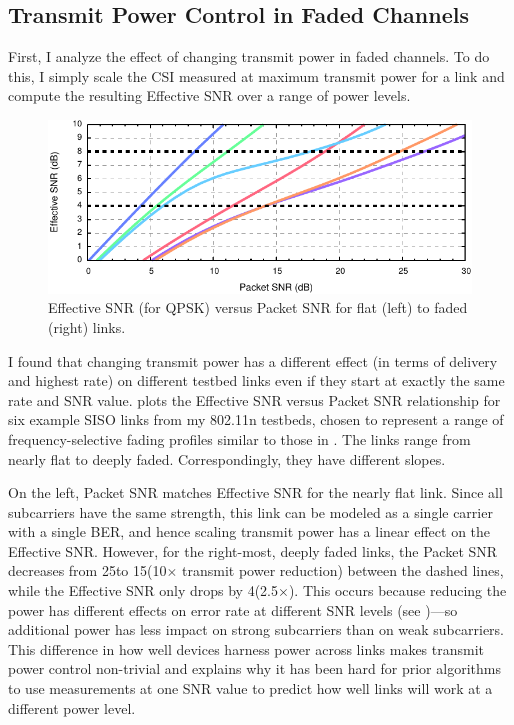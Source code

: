 \subsection{Transmit Power Control in Faded Channels}
First, I analyze the effect of changing transmit power in faded channels. To do this, I simply scale the CSI measured at maximum transmit power for a link and compute the resulting Effective SNR over a range of power levels.

\begin{figure}[t]
  \centering
  \includegraphics[width=\textwidth]{figures/delivery/eff_vs_snr_qpsk.pdf}
  \caption[Effective SNR vs Packet SNR for four faded links]{Effective SNR (for QPSK) versus Packet SNR for flat (left) to faded (right) links.}
  \label{fig:eff_vs_rssi}
\end{figure}

I found that changing transmit power has a different effect (in terms of delivery and highest rate) on different testbed links even if they start at exactly the same rate and SNR value.  plots the Effective SNR versus Packet SNR relationship for six example SISO links from my 802.11n testbeds, chosen to represent a range of frequency-selective fading profiles similar to those in . The links range from nearly flat to deeply faded. Correspondingly, they have different slopes.

On the left, Packet SNR matches Effective SNR for the nearly flat link. Since all subcarriers have the same strength, this link can be modeled as a single carrier with a single BER, and hence scaling transmit power has a linear effect on the Effective SNR. However, for the right-most, deeply faded links, the Packet SNR decreases from 25\dB to 15\dB (10$\times$ transmit power reduction) between the dashed lines, while the Effective SNR only drops by 4\dB (2.5$\times$). This occurs because reducing the power has different effects on error rate at different SNR levels (see )---so additional power has less impact on strong subcarriers than on weak subcarriers. This difference in how well devices harness power across links makes transmit power control non-trivial and explains why it has been hard for prior algorithms to use measurements at one SNR value to predict how well links will work at a different power level.

